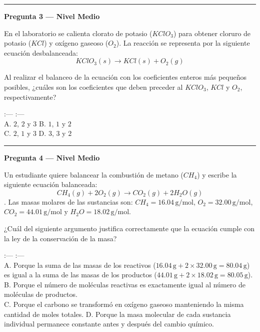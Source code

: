 \documentclass[
  spanish,
  letterpaper,
  12pt,
  oneside,
  open=any]{scrbook}
\begin{document}
\begin{center}\rule{0.5\linewidth}{0.5pt}\end{center}

\textbf{Pregunta 3 --- Nivel Medio}

En el laboratorio se calienta clorato de potasio (\(K{Cl}O_3\)) para
obtener cloruro de potasio (\(K{Cl}\)) y oxígeno gaseoso (\(O_2\)). La
reacción se representa por la siguiente ecuación desbalanceada:
\[K{Cl}O_3(s) \rightarrow K{Cl}(s) + O_2(g)\]

Al realizar el balanceo de la ecuación con los coeficientes enteros más
pequeños posibles, ¿cuáles son los coeficientes que deben preceder al
\(K{Cl}O_3\), \(K{Cl}\) y \(O_2\), respectivamente?

:--- \textbar{} :--- \textbar{}\\
A. \(2\), \(2\) y \(3\) \textbar{} B. \(1\), \(1\) y \(2\) \textbar{}\\
C. \(2\), \(1\) y \(3\) \textbar{} D. \(3\), \(3\) y \(2\) \textbar{}

\begin{center}\rule{0.5\linewidth}{0.5pt}\end{center}

\textbf{Pregunta 4 --- Nivel Medio}

Un estudiante quiere balancear la combustión de metano (\(CH_4\)) y
escribe la siguiente ecuación balanceada:
\[CH_4(g) + 2O_2(g) \rightarrow CO_2(g) + 2H_2O(g)\]. Las masas molares
de las sustancias son: \(CH_4 = 16.04\,\text{g/mol}\),
\(O_2 = 32.00\,\text{g/mol}\), \(CO_2 = 44.01\,\text{g/mol}\) y
\(H_2O = 18.02\,\text{g/mol}\).

¿Cuál del siguiente argumento justifica correctamente que la ecuación
cumple con la ley de la conservación de la masa?

:--- \textbar{} :--- \textbar{}\\
A. Porque la suma de las masas de los reactivos
(\(16.04\,\text{g} + 2 \times 32.00\,\text{g} = 80.04\,\text{g}\)) es
igual a la suma de las masas de los productos
(\(44.01\,\text{g} + 2 \times 18.02\,\text{g} = 80.05\,\text{g}\)).
\textbar{} B. Porque el número de moléculas reactivas es exactamente
igual al número de moléculas de productos. \textbar{}\\
C. Porque el carbono se transformó en oxígeno gaseoso manteniendo la
misma cantidad de moles totales. \textbar{} D. Porque la masa molecular
de cada sustancia individual permanece constante antes y después del
cambio químico. \textbar{}
\end{document}
